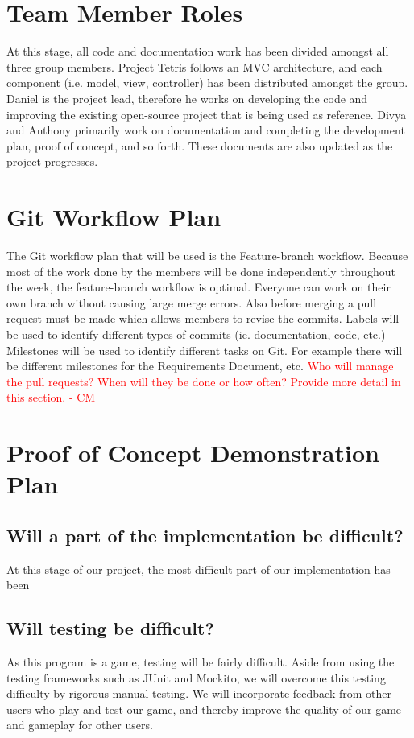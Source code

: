 \documentclass{article}
\begin{document}
\section{Team Member Roles}
At this stage, all code and documentation work has been divided amongst all three group members. Project Tetris follows an MVC architecture, and each component (i.e. model, view, controller) has been distributed amongst the group. Daniel is the project lead, therefore he works on developing the code and improving the existing open-source project that is being used as reference. Divya and Anthony primarily work on documentation and completing the development plan, proof of concept, and so forth. These documents are also updated as the project progresses.
\section{Git Workflow Plan}
The Git workflow plan that will be used is the Feature-branch workflow. Because most of the work done by the members will be done independently throughout the week, the feature-branch workflow is optimal. Everyone can work on their own branch without causing large merge errors. Also before merging a pull request must be made which allows members to revise the commits. Labels will be used to identify different types of commits (ie. documentation, code, etc.) Milestones will be used to identify different tasks on Git. For example there will be different milestones for the Requirements Document, etc. \textcolor{red}{Who will manage the pull requests? When will they be done or how often? Provide more detail in this section. - CM} \\
\section{Proof of Concept Demonstration Plan}
\subsection{Will a part of the implementation be difficult?}
At this stage of our project, the most difficult part of our implementation has been 
\subsection{Will testing be difficult?}
As this program is a game, testing will be fairly difficult. Aside from using the testing frameworks such as JUnit and Mockito, we will overcome this testing difficulty by rigorous manual testing. We will incorporate feedback from other users who play and test our game, and thereby improve the quality of our game and gameplay for other users.
\end{document}
